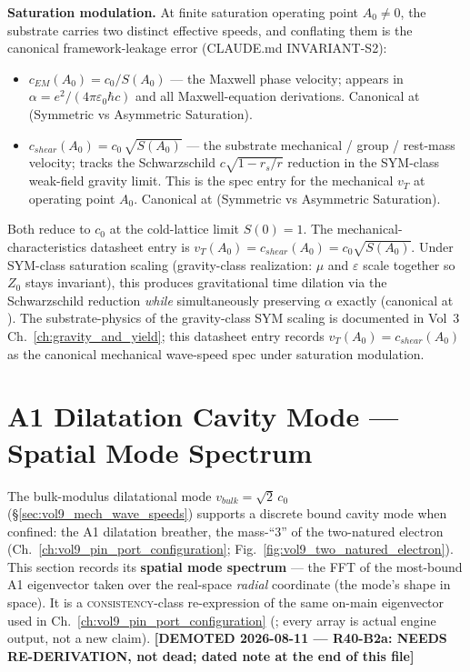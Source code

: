 \textbf{Saturation modulation.} At finite saturation operating point $A_0 \neq 0$, the substrate carries two distinct effective speeds, and conflating them is the canonical framework-leakage error (CLAUDE.md INVARIANT-S2):

\begin{itemize}
    \item $c_{EM}(A_0) = c_0 / S(A_0)$ --- the Maxwell phase velocity; appears in $\alpha = e^2/(4\pi\varepsilon_0 \hbar c)$ and all Maxwell-equation derivations. Canonical at  (Symmetric vs Asymmetric Saturation).
    \item $c_{shear}(A_0) = c_0\, \sqrt{S(A_0)}$ --- the substrate mechanical / group / rest-mass velocity; tracks the Schwarzschild $c\sqrt{1 - r_s/r}$ reduction in the SYM-class weak-field gravity limit. This is the spec entry for the mechanical $v_T$ at operating point $A_0$. Canonical at  (Symmetric vs Asymmetric Saturation).
\end{itemize}

Both reduce to $c_0$ at the cold-lattice limit $S(0) = 1$. The mechanical-characteristics datasheet entry is $v_T(A_0) = c_{shear}(A_0) = c_0 \sqrt{S(A_0)}$. Under SYM-class saturation scaling (gravity-class realization: $\mu$ and $\varepsilon$ scale together so $Z_0$ stays invariant), this produces gravitational time dilation via the Schwarzschild reduction \emph{while} simultaneously preserving $\alpha$ exactly (canonical at ). The substrate-physics of the gravity-class SYM scaling is documented in Vol~3 Ch.~\ref{ch:gravity_and_yield}; this datasheet entry records $v_T(A_0) = c_{shear}(A_0)$ as the canonical mechanical wave-speed spec under saturation modulation.

\section{A1 Dilatation Cavity Mode --- Spatial Mode Spectrum}
\label{sec:vol9_a1_spatial_mode_spectrum}

The bulk-modulus dilatational mode $v_{bulk}=\sqrt2\,c_0$ (\S\ref{sec:vol9_mech_wave_speeds}) supports a discrete bound cavity mode when confined: the A1 dilatation breather, the mass-``3'' of the two-natured electron (Ch.~\ref{ch:vol9_pin_port_configuration}; Fig.~\ref{fig:vol9_two_natured_electron}). This section records its \textbf{spatial mode spectrum} --- the FFT of the most-bound A1 eigenvector taken over the real-space \emph{radial} coordinate (the mode's shape in space). It is a \textsc{consistency}-class re-expression of the same on-main eigenvector used in Ch.~\ref{ch:vol9_pin_port_configuration} (\texttt{}; every array is actual engine output, not a new claim). \textbf{[DEMOTED 2026-08-11 --- R40-B2a: NEEDS RE-DERIVATION, not dead; dated note at the end of this file]}

